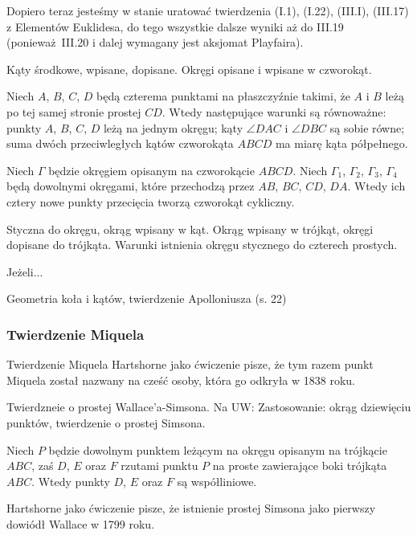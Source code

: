 Dopiero teraz jesteśmy w stanie uratować twierdzenia (I.1), (I.22), (III.I), (III.17) z Elementów Euklidesa, do tego wszystkie dalsze wyniki aż do III.19 (ponieważ III.20 i dalej wymagany jest aksjomat Playfaira).



Kąty środkowe, wpisane, dopisane.
Okręgi opisane i wpisane w czworokąt.

\begin{proposition}
	Niech $A$, $B$, $C$, $D$ będą czterema punktami na płaszczyźnie takimi, że $A$ i $B$ leżą po tej samej stronie prostej $CD$.
	Wtedy następujące warunki są równoważne: punkty $A$, $B$, $C$, $D$ leżą na jednym okręgu; kąty $\angle DAC$ i $\angle DBC$ są sobie równe; suma dwóch przeciwległych kątów czworokąta $ABCD$ ma miarę kąta półpełnego.
\end{proposition}

\begin{proposition}
	Niech $\Gamma$ będzie okręgiem opisanym na czworokącie $ABCD$.
	Niech $\Gamma_1$, $\Gamma_2$, $\Gamma_3$, $\Gamma_4$ będą dowolnymi okręgami, które przechodzą przez $AB$, $BC$, $CD$, $DA$.
	Wtedy ich cztery nowe punkty przecięcia tworzą czworokąt cykliczny.
\end{proposition}


Styczna do okręgu, okrąg wpisany w kąt.
Okrąg wpisany w trójkąt, okręgi dopisane do trójkąta.
Warunki istnienia okręgu stycznego do czterech prostych.

\begin{proposition}
	Jeżeli...
\end{proposition}

Geometria koła i kątów, twierdzenie Apolloniusza (s. 22)

\subsubsection{Twierdzenie Miquela}
Twierdzenie Miquela
\loremipsum
Hartshorne jako ćwiczenie \cite[s. 61]{hartshorne2000} pisze, że tym razem punkt Miquela został nazwany na cześć osoby, która go odkryła w 1838 roku.

Twierdzneie o prostej Wallace'a-Simsona.
Na UW: Zastosowanie: okrąg dziewięciu punktów, twierdzenie o prostej Simsona.

\begin{proposition}
	Niech $P$ będzie dowolnym punktem leżącym na okręgu opisanym na trójkącie $ABC$, zaś $D$, $E$ oraz $F$ rzutami punktu $P$ na proste zawierające boki trójkąta $ABC$.
	Wtedy punkty $D$, $E$ oraz $F$ są współliniowe.
\end{proposition}

Hartshorne jako ćwiczenie \cite[s. 61]{hartshorne2000} pisze, że istnienie prostej Simsona jako pierwszy dowiódł Wallace w 1799 roku.
